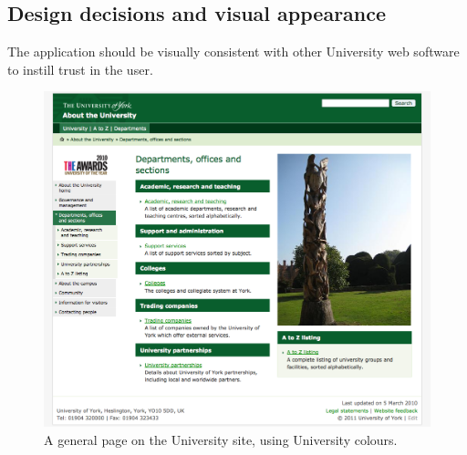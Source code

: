 \documentclass[]{scrartcl}
\begin{document}

\subsection{Design decisions and visual appearance}

The application should be visually consistent with other University web
software to instill trust in the user.

\begin{figure}
  \begin{center}
    \includegraphics[width=160mm]{images/2011_11_06_yorkacuk.png}
  \end{center}
  \caption{A general page on the University site, using University colours.}
  \label{yorkacuk_general_page}
\end{figure}
\end{document}

